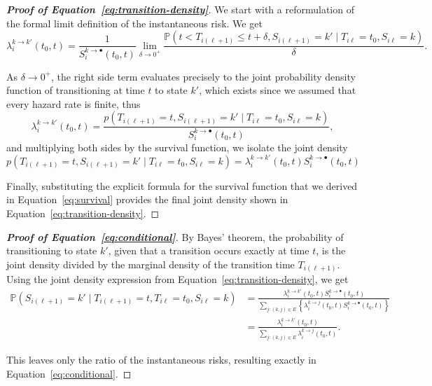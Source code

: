 \documentclass{sn-jnl}
\begin{document}
\begin{proof}[\textbf{Proof of Equation~\ref{eq:transition-density}}]
We start with a reformulation of the formal limit definition of the instantaneous risk. We get
\[
\lambda_i^{k \to k'}(t_0, t) = \frac{1}{S_i^{k \to \bullet}(t_0, t)} \lim_{\delta \to 0^+} \frac{\mathbb{P}(t < T_{i(\ell+1)} \leq t + \delta, S_{i(\ell+1)}=k' \mid T_{i\ell}=t_0, S_{i\ell}=k)}{\delta}.
\]

As $\delta \to 0^+$, the right side term evaluates precisely to the joint probability density function of transitioning at time $t$ to state $k'$, which exists since we assumed that every hazard rate is finite, thus
\[
\lambda_i^{k \to k'}(t_0, t) = \frac{p(T_{i(\ell+1)}=t, S_{i(\ell+1)}=k' \mid T_{i\ell}=t_0, S_{i\ell}=k)}{S_i^{k \to \bullet}(t_0, t)},
\]
and multiplying both sides by the survival function, we isolate the joint density
\[
p(T_{i(\ell+1)}=t, S_{i(\ell+1)}=k' \mid T_{i\ell}=t_0, S_{i\ell}=k) = \lambda_i^{k \to k'}(t_0, t) S_i^{k \to \bullet}(t_0, t)
\]

\bigbreak

Finally, substituting the explicit formula for the survival function that we derived in Equation~\ref{eq:survival} provides the final joint density shown in Equation~\ref{eq:transition-density}.
\end{proof}

\bigbreak

\begin{proof}[\textbf{Proof of Equation~\ref{eq:conditional}}]
By Bayes' theorem, the probability of transitioning to state $k'$, given that a transition occurs exactly at time $t$, is the joint density divided by the marginal density of the transition time $T_{i(\ell+1)}$. Using the joint density expression from Equation~\ref{eq:transition-density}, we get
\begin{align*}
\mathbb{P}(S_{i(\ell+1)} = k' \mid T_{i(\ell+1)}=t, T_{i\ell}=t_0, S_{i\ell}=k) &= \frac{\lambda_i^{k \to k'}(t_0, t) S_i^{k \to \bullet}(t_0, t)}{\sum_{j : (k, j) \in E} \left\{ \lambda_i^{k \to j}(t_0, t) S_i^{k \to \bullet}(t_0, t) \right\}} \\
&= \frac{\lambda_i^{k \to k'}(t_0, t)}{\sum_{j : (k, j) \in E} \lambda_i^{k \to j}(t_0, t)}.
\end{align*}

\bigbreak

This leaves only the ratio of the instantaneous risks, resulting exactly in Equation~\ref{eq:conditional}.
\end{proof}
\end{document}
